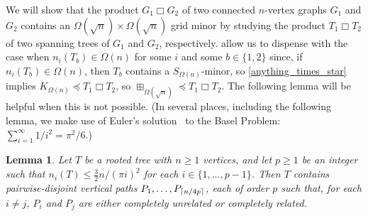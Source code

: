 \documentclass{patmorin}
\newcommand{\boxprod}{\mathbin{\Box}}
\DeclarePairedDelimiter{\ceil}{\lceil}{\rceil}
\renewcommand{\ge}{\geqslant}
\renewcommand{\geq}{\geqslant}
\renewcommand{\leq}{\leqslant}
\DeclareMathOperator{\gm}{gm}
\theoremstyle{plain}
\newtheorem{lem}[thm]{Lemma}
\theoremstyle{definition}
\begin{document}
We will show that the product $G_1\boxprod G_2$ of two connected $n$-vertex graphs $G_1$ and $G_2$ contains an $\Omega(\sqrt{n})\times\Omega(\sqrt{n})$ grid minor by studying the product $T_1\boxprod T_2$ of two spanning trees of $G_1$ and $G_2$, respectively.  allow us to dispense with the case when $n_i(T_b)\in\Omega(n)$ for some $i$ and some $b\in\{1,2\}$ since, if $n_i(T_b)\in\Omega(n)$, then $T_b$ contains a $S_{\Omega(n)}$-minor, so \cref{anything_times_star} implies $K_{\Omega(n)}\preceq T_1\boxprod T_2$, so $\boxplus_{\Omega(\sqrt{n})}\preceq T_1\boxprod T_2$.
The following lemma will be helpful when this is not possible.  (In several places, including the following lemma, we make use of Euler's solution~\citep{EulerBasel} to the Basel Problem: $\sum_{i=1}^\infty 1/i^2 = \pi^2/6$.)

\begin{lem}\label{disjoint_p_paths}
  Let $T$ be a rooted tree with $n\ge 1$ vertices, and let $p\geq 1$ be an integer such that $n_i(T) \leq \tfrac{3}{2}n/(\pi i)^2$ for each $i\in\{1,\ldots,p-1\}$.  Then $T$ contains pairwise-disjoint vertical paths $P_1,\ldots,P_{\ceil{n/4p}}$, each of order $p$ such that, for each $i\neq j$, $P_i$ and $P_j$ are either completely unrelated or completely related.
\end{lem}
\end{document}
